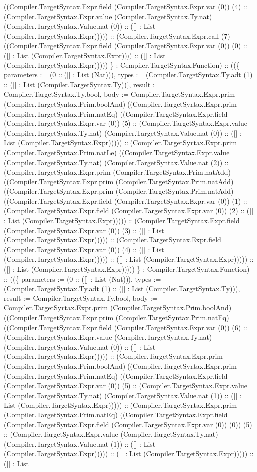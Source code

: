 \documentclass[11pt]{article}
\begin{document}
((Compiler.TargetSyntax.Expr.field (Compiler.TargetSyntax.Expr.var (0)) (4) :: (Compiler.TargetSyntax.Expr.value (Compiler.TargetSyntax.Ty.nat) (Compiler.TargetSyntax.Value.nat (0)) :: ([] : List (Compiler.TargetSyntax.Expr))))) :: (Compiler.TargetSyntax.Expr.call (7) ((Compiler.TargetSyntax.Expr.field (Compiler.TargetSyntax.Expr.var (0)) (0) :: ([] : List (Compiler.TargetSyntax.Expr)))) :: ([] : List (Compiler.TargetSyntax.Expr))))) \} : Compiler.TargetSyntax.Function) :: ((\{ parameters := (0 :: ([] : List (Nat))), types := (Compiler.TargetSyntax.Ty.adt (1) :: ([] : List (Compiler.TargetSyntax.Ty))), result := Compiler.TargetSyntax.Ty.bool, body := Compiler.TargetSyntax.Expr.prim (Compiler.TargetSyntax.Prim.boolAnd) ((Compiler.TargetSyntax.Expr.prim (Compiler.TargetSyntax.Prim.natEq) ((Compiler.TargetSyntax.Expr.field (Compiler.TargetSyntax.Expr.var (0)) (5) :: (Compiler.TargetSyntax.Expr.value (Compiler.TargetSyntax.Ty.nat) (Compiler.TargetSyntax.Value.nat (0)) :: ([] : List (Compiler.TargetSyntax.Expr))))) :: (Compiler.TargetSyntax.Expr.prim (Compiler.TargetSyntax.Prim.natLe) ((Compiler.TargetSyntax.Expr.value (Compiler.TargetSyntax.Ty.nat) (Compiler.TargetSyntax.Value.nat (2)) :: (Compiler.TargetSyntax.Expr.prim (Compiler.TargetSyntax.Prim.natAdd) ((Compiler.TargetSyntax.Expr.prim (Compiler.TargetSyntax.Prim.natAdd) ((Compiler.TargetSyntax.Expr.prim (Compiler.TargetSyntax.Prim.natAdd) ((Compiler.TargetSyntax.Expr.field (Compiler.TargetSyntax.Expr.var (0)) (1) :: (Compiler.TargetSyntax.Expr.field (Compiler.TargetSyntax.Expr.var (0)) (2) :: ([] : List (Compiler.TargetSyntax.Expr))))) :: (Compiler.TargetSyntax.Expr.field (Compiler.TargetSyntax.Expr.var (0)) (3) :: ([] : List (Compiler.TargetSyntax.Expr))))) :: (Compiler.TargetSyntax.Expr.field (Compiler.TargetSyntax.Expr.var (0)) (4) :: ([] : List (Compiler.TargetSyntax.Expr))))) :: ([] : List (Compiler.TargetSyntax.Expr))))) :: ([] : List (Compiler.TargetSyntax.Expr))))) \} : Compiler.TargetSyntax.Function) :: ((\{ parameters := (0 :: ([] : List (Nat))), types := (Compiler.TargetSyntax.Ty.adt (1) :: ([] : List (Compiler.TargetSyntax.Ty))), result := Compiler.TargetSyntax.Ty.bool, body := Compiler.TargetSyntax.Expr.prim (Compiler.TargetSyntax.Prim.boolAnd) ((Compiler.TargetSyntax.Expr.prim (Compiler.TargetSyntax.Prim.natEq) ((Compiler.TargetSyntax.Expr.field (Compiler.TargetSyntax.Expr.var (0)) (6) :: (Compiler.TargetSyntax.Expr.value (Compiler.TargetSyntax.Ty.nat) (Compiler.TargetSyntax.Value.nat (0)) :: ([] : List (Compiler.TargetSyntax.Expr))))) :: (Compiler.TargetSyntax.Expr.prim (Compiler.TargetSyntax.Prim.boolAnd) ((Compiler.TargetSyntax.Expr.prim (Compiler.TargetSyntax.Prim.natEq) ((Compiler.TargetSyntax.Expr.field (Compiler.TargetSyntax.Expr.var (0)) (5) :: (Compiler.TargetSyntax.Expr.value (Compiler.TargetSyntax.Ty.nat) (Compiler.TargetSyntax.Value.nat (1)) :: ([] : List (Compiler.TargetSyntax.Expr))))) :: (Compiler.TargetSyntax.Expr.prim (Compiler.TargetSyntax.Prim.natEq) ((Compiler.TargetSyntax.Expr.field (Compiler.TargetSyntax.Expr.field (Compiler.TargetSyntax.Expr.var (0)) (0)) (5) :: (Compiler.TargetSyntax.Expr.value (Compiler.TargetSyntax.Ty.nat) (Compiler.TargetSyntax.Value.nat (1)) :: ([] : List (Compiler.TargetSyntax.Expr))))) :: ([] : List (Compiler.TargetSyntax.Expr))))) :: ([] : List 
\end{document}
